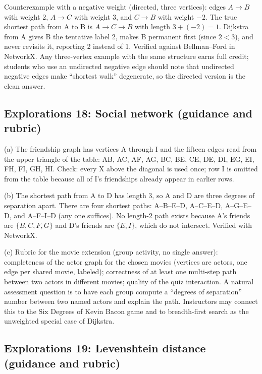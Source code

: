 Counterexample with a negative weight (directed, three vertices): edges $A \to B$ with weight 2, $A \to C$ with weight 3, and $C \to B$ with weight $-2$. The true shortest path from A to B is $A \to C \to B$ with length $3 + (-2) = 1$. Dijkstra from A gives B the tentative label 2, makes B permanent first (since $2 < 3$), and never revisits it, reporting 2 instead of 1. Verified against Bellman--Ford in NetworkX. Any three-vertex example with the same structure earns full credit; students who use an undirected negative edge should note that undirected negative edges make ``shortest walk'' degenerate, so the directed version is the clean answer.

\subsection*{Explorations 18: Social network (guidance and rubric)}

(a) The friendship graph has vertices A through I and the fifteen edges read from the upper triangle of the table: AB, AC, AF, AG, BC, BE, CE, DE, DI, EG, EI, FH, FI, GH, HI. Check: every X above the diagonal is used once; row I is omitted from the table because all of I's friendships already appear in earlier rows.

(b) The shortest path from A to D has length 3, so A and D are three degrees of separation apart. There are four shortest paths: A--B--E--D, A--C--E--D, A--G--E--D, and A--F--I--D (any one suffices). No length-2 path exists because A's friends are $\{B, C, F, G\}$ and D's friends are $\{E, I\}$, which do not intersect. Verified with NetworkX.

(c) Rubric for the movie extension (group activity, no single answer): completeness of the actor graph for the chosen movies (vertices are actors, one edge per shared movie, labeled); correctness of at least one multi-step path between two actors in different movies; quality of the quiz interaction. A natural assessment question is to have each group compute a ``degrees of separation'' number between two named actors and explain the path. Instructors may connect this to the Six Degrees of Kevin Bacon game and to breadth-first search as the unweighted special case of Dijkstra.

\subsection*{Explorations 19: Levenshtein distance (guidance and rubric)}

